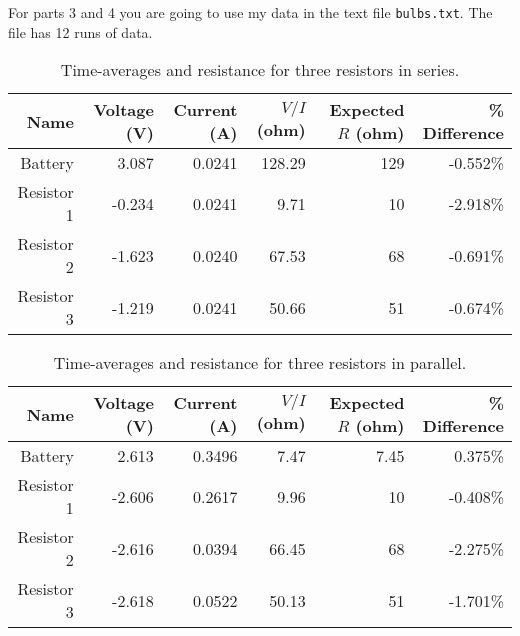 For parts 3 and 4 you are going to use my data in the text file \texttt{bulbs.txt}. The file has 12 runs of data.
\begin{table}[ht!]
	\begin{center}
		\begin{tabular}{|r|r|r|r|r|r|}
			\hline
			Name & Voltage (V) & Current (A) & $V/I$ (ohm) & Expected $R$ (ohm) & \% Difference \\
			\hline
			Battery & 3.087 & 0.0241 & 128.29 & 129 & -0.552\% \\
			Resistor 1 & -0.234 & 0.0241 & 9.71 & 10 & -2.918\% \\
			Resistor 2 & -1.623 & 0.0240 & 67.53 & 68 & -0.691\% \\
			Resistor 3 & -1.219 & 0.0241 & 50.66 & 51 & -0.674\% \\
			\hline
		\end{tabular}
	\end{center}
	\caption{Time-averages and resistance for three resistors in series.}
	\label{table.03.3resistors.series}
\end{table}
\begin{table}[ht!]
	\begin{center}
		\begin{tabular}{|r|r|r|r|r|r|}
			\hline
			Name & Voltage (V) & Current (A) & $V/I$ (ohm) & Expected $R$ (ohm) & \% Difference \\
			\hline
			Battery & 2.613 & 0.3496 & 7.47 & 7.45 & 0.375\% \\
			Resistor 1 & -2.606 & 0.2617 & 9.96 & 10 & -0.408\% \\
			Resistor 2 & -2.616 & 0.0394 & 66.45 & 68 & -2.275\% \\
			Resistor 3 & -2.618 & 0.0522 & 50.13 & 51 & -1.701\% \\
			\hline
		\end{tabular}
	\end{center}
	\caption{Time-averages and resistance for three resistors in parallel.}
	\label{table.03.3resistors.parallel}
\end{table}
